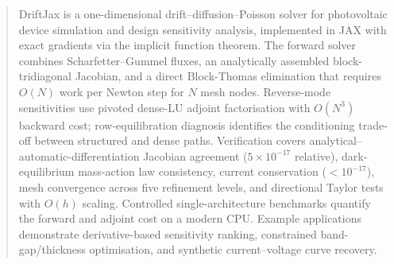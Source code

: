 \begin{abstract}
DriftJax is a one-dimensional drift--diffusion--Poisson solver for
photovoltaic device simulation and design sensitivity analysis, implemented
in JAX with exact gradients via the implicit function theorem. The forward
solver combines Scharfetter--Gummel fluxes, an analytically assembled
block-tridiagonal Jacobian, and a direct Block-Thomas elimination that
requires $O(N)$ work per Newton step for $N$ mesh nodes. Reverse-mode
sensitivities use pivoted dense-LU adjoint factorisation with
$O(N^3)$ backward cost; row-equilibration diagnosis identifies the
 conditioning trade-off between structured and dense paths.
Verification covers analytical--automatic-differentiation Jacobian
agreement ($5\times10^{-17}$ relative), dark-equilibrium mass-action
law consistency, current conservation ($<10^{-17}$), mesh convergence
across five refinement levels, and directional Taylor tests with
$O(h)$ scaling. Controlled single-architecture benchmarks quantify
the forward and adjoint cost on a modern CPU. Example applications
demonstrate derivative-based sensitivity ranking, constrained
band-gap/thickness optimisation, and synthetic current--voltage
curve recovery.
\end{abstract}
